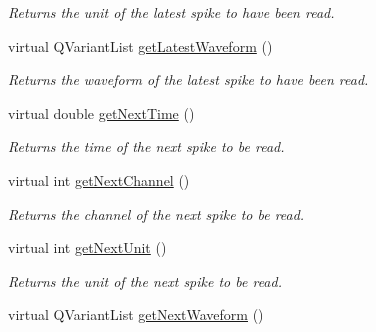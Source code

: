 \begin{DoxyCompactItemize}
\begin{DoxyCompactList}\small\item\em Returns the unit of the latest spike to have been read. \end{DoxyCompactList}\item 
\hypertarget{class_picto_1_1_live_spike_reader_a506a991dee2257641731615c6928b9de}{virtual Q\-Variant\-List \hyperlink{class_picto_1_1_live_spike_reader_a506a991dee2257641731615c6928b9de}{get\-Latest\-Waveform} ()}\label{class_picto_1_1_live_spike_reader_a506a991dee2257641731615c6928b9de}

\begin{DoxyCompactList}\small\item\em Returns the waveform of the latest spike to have been read. \end{DoxyCompactList}\item 
\hypertarget{class_picto_1_1_live_spike_reader_a54426182421b3cfbd0b8ea1243a1e729}{virtual double \hyperlink{class_picto_1_1_live_spike_reader_a54426182421b3cfbd0b8ea1243a1e729}{get\-Next\-Time} ()}\label{class_picto_1_1_live_spike_reader_a54426182421b3cfbd0b8ea1243a1e729}

\begin{DoxyCompactList}\small\item\em Returns the time of the next spike to be read. \end{DoxyCompactList}\item 
\hypertarget{class_picto_1_1_live_spike_reader_a236093aaa50475ce8ba15561272d1141}{virtual int \hyperlink{class_picto_1_1_live_spike_reader_a236093aaa50475ce8ba15561272d1141}{get\-Next\-Channel} ()}\label{class_picto_1_1_live_spike_reader_a236093aaa50475ce8ba15561272d1141}

\begin{DoxyCompactList}\small\item\em Returns the channel of the next spike to be read. \end{DoxyCompactList}\item 
\hypertarget{class_picto_1_1_live_spike_reader_a75d2c1adc13e15867ea52d87ae0c86c9}{virtual int \hyperlink{class_picto_1_1_live_spike_reader_a75d2c1adc13e15867ea52d87ae0c86c9}{get\-Next\-Unit} ()}\label{class_picto_1_1_live_spike_reader_a75d2c1adc13e15867ea52d87ae0c86c9}

\begin{DoxyCompactList}\small\item\em Returns the unit of the next spike to be read. \end{DoxyCompactList}\item 
\hypertarget{class_picto_1_1_live_spike_reader_a1369b9a13930fbce83a9c7aa65c2b1ab}{virtual Q\-Variant\-List \hyperlink{class_picto_1_1_live_spike_reader_a1369b9a13930fbce83a9c7aa65c2b1ab}{get\-Next\-Waveform} ()}\label{class_picto_1_1_live_spike_reader_a1369b9a13930fbce83a9c7aa65c2b1ab}


\end{DoxyCompactItemize}
